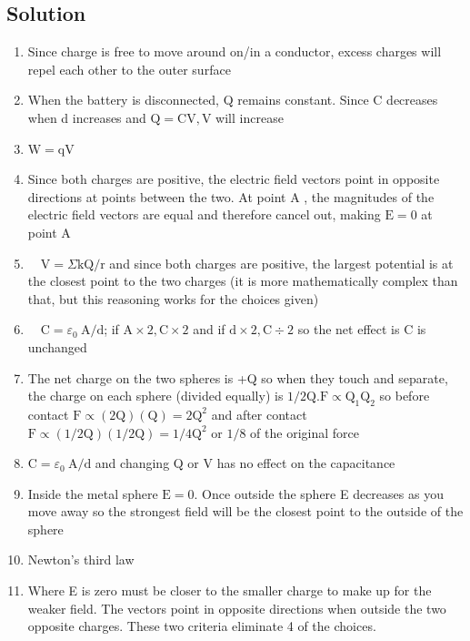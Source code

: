 \begin{enumerate}
\section*{Solution}
\begin{enumerate}
  \item Since charge is free to move around on/in a conductor, excess charges will repel each other to the outer surface
  \item When the battery is disconnected, Q remains constant. Since C decreases when d increases and $\mathrm{Q}=\mathrm{CV}, \mathrm{V}$ will increase
  \item $\mathrm{W}=\mathrm{qV}$
  \item Since both charges are positive, the electric field vectors point in opposite directions at points between the two. At point A , the magnitudes of the electric field vectors are equal and therefore cancel out, making $\mathrm{E}=0$ at point A
  \item $\quad \mathrm{V}=\Sigma \mathrm{kQ} / \mathrm{r}$ and since both charges are positive, the largest potential is at the closest point to the two charges (it is more mathematically complex than that, but this reasoning works for the choices given)
  \item $\quad \mathrm{C}=\varepsilon_{0} \mathrm{~A} / \mathrm{d}$; if $\mathrm{A} \times 2, \mathrm{C} \times 2$ and if $\mathrm{d} \times 2, \mathrm{C} \div 2$ so the net effect is C is unchanged
  \item The net charge on the two spheres is +Q so when they touch and separate, the charge on each sphere (divided equally) is $1 / 2 \mathrm{Q} . \mathrm{F} \propto \mathrm{Q}_{1} \mathrm{Q}_{2}$ so before contact $\mathrm{F} \propto(2 \mathrm{Q})(\mathrm{Q})=2 \mathrm{Q}^{2}$ and after contact $\mathrm{F} \propto(1 / 2 \mathrm{Q})(1 / 2 \mathrm{Q})=1 / 4 \mathrm{Q}^{2}$ or $1 / 8$ of the original force
  \item $\mathrm{C}=\varepsilon_{0} \mathrm{~A} / \mathrm{d}$ and changing Q or V has no effect on the capacitance
  \item Inside the metal sphere $\mathrm{E}=0$. Once outside the sphere E decreases as you move away so the strongest field will be the closest point to the outside of the sphere
  \item Newton's third law
  \item Where E is zero must be closer to the smaller charge to make up for the weaker field. The vectors point in opposite directions when outside the two opposite charges. These two criteria eliminate 4 of the choices.

\end{enumerate}
\end{enumerate}
